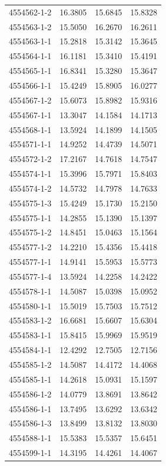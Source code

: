 \begin{longtable}{lrrr}
4554562-1-2 & 16.3805 & 15.6845 & 15.8328 \\
4554563-1-2 & 15.5050 & 16.2670 & 16.2611 \\
4554563-1-1 & 15.2818 & 15.3142 & 15.3645 \\
4554564-1-1 & 16.1181 & 15.3410 & 15.4191 \\
4554565-1-1 & 16.8341 & 15.3280 & 15.3647 \\
4554566-1-1 & 15.4249 & 15.8905 & 16.0277 \\
4554567-1-2 & 15.6073 & 15.8982 & 15.9316 \\
4554567-1-1 & 13.3047 & 14.1584 & 14.1713 \\
4554568-1-1 & 13.5924 & 14.1899 & 14.1505 \\
4554571-1-1 & 14.9252 & 14.4739 & 14.5071 \\
4554572-1-2 & 17.2167 & 14.7618 & 14.7547 \\
4554574-1-1 & 15.3996 & 15.7971 & 15.8403 \\
4554574-1-2 & 14.5732 & 14.7978 & 14.7633 \\
4554575-1-3 & 15.4249 & 15.1730 & 15.2150 \\
4554575-1-1 & 14.2855 & 15.1390 & 15.1397 \\
4554575-1-2 & 14.8451 & 15.0463 & 15.1564 \\
4554577-1-2 & 14.2210 & 15.4356 & 15.4418 \\
4554577-1-1 & 14.9141 & 15.5953 & 15.5773 \\
4554577-1-4 & 13.5924 & 14.2258 & 14.2422 \\
4554578-1-1 & 14.5087 & 15.0398 & 15.0952 \\
4554580-1-1 & 15.5019 & 15.7503 & 15.7512 \\
4554583-1-2 & 16.6681 & 15.6607 & 15.6304 \\
4554583-1-1 & 15.8415 & 15.9969 & 15.9519 \\
4554584-1-1 & 12.4292 & 12.7505 & 12.7156 \\
4554585-1-2 & 14.5087 & 14.4172 & 14.4068 \\
4554585-1-1 & 14.2618 & 15.0931 & 15.1597 \\
4554586-1-2 & 14.0779 & 13.8691 & 13.8642 \\
4554586-1-1 & 13.7495 & 13.6292 & 13.6342 \\
4554586-1-3 & 13.8499 & 13.8132 & 13.8030 \\
4554588-1-1 & 15.5383 & 15.5357 & 15.6451 \\
4554599-1-1 & 14.3195 & 14.4261 & 14.4067 \\

\end{longtable}
